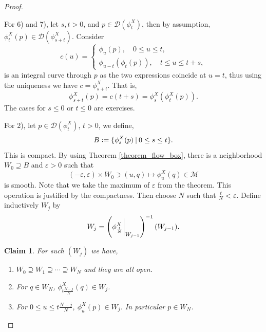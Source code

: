 \documentclass[10pt]{article}
\newtheorem{claim}{Claim}
\newcommand{\defeq}{\vcentcolon=}
\newcommand{\M}[0]{\mathcal{M}}
\newcommand{\sep}[0]{\:|\:}
\begin{document}
\begin{proof}$\:$
  \par For 6) and 7), let $s,t>0$, and $p\in\mathcal{D}(\phi_t^X)$, then by assumption, $\phi_t^X(p)\in\mathcal{D}(\phi_{s+t}^X)$. Consider 
  \begin{equation*}
    c(u) = \begin{cases}
      \phi_u(p),\quad 0\leq u\leq t,\\
      \phi_{u-t}(\phi_t(p)), \quad t\leq u \leq t+s,
    \end{cases}
  \end{equation*}
  is an integral curve through $p$ as the two expressions coincide at $u=t$, thus using the uniqueness we have $c = \phi^X_{s+t}$. That is,
  \begin{equation*}
    \phi_{s+t}^X(p) = c(t+s) = \phi^X_s(\phi_t^X(p)).
  \end{equation*}
  The cases for $s\leq 0$ or $t\leq 0$ are exercises.\\
  \par For 2), let $p\in\mathcal{D}(\phi_t^X)$, $t>0$, we define,
  \begin{equation*}
    B\defeq\{\phi_s^X(p) \sep 0\leq s \leq t\}.
  \end{equation*}
  This is compact. By using Theorem \ref{theorem_flow_box}, there is a neighborhood $W_0\supseteq B$ and $\varepsilon>0$ such that 
  \begin{equation*}
    (-\varepsilon,\varepsilon)\times W_0\ni(u,q)\mapsto \phi_u^X(q) \in\M
  \end{equation*}
  is smooth. Note that we take the maximum of $\varepsilon$ from the theorem. This operation is justified by the compactness. Then choose $N$ such that ${\frac t N}<\varepsilon$. Define inductively $W_j$ by 
  \begin{equation*}
    W_j = \left(\phi_{{\frac t N}}^X\bigg{|}_{W_{j-1}}\right)^{-1}(W_{j-1}).
  \end{equation*}
  \begin{claim}For such $(W_j)$ we have,
  \begin{enumerate}[1).]
    \item $W_0\supseteq W_1\supseteq\cdots \supseteq W_N$ and they are all open.
    \item For $q\in W_N$, $\phi_{t{\frac {N-j} {N}}}^X(q)\in W_j$.
    \item For $0\leq u\leq t{\frac {N-j} N}$, $\phi_u^X(p)\in W_j$. In particular $p\in W_N$. 
  \end{enumerate}
  \end{claim}

\end{proof}
\end{document}
